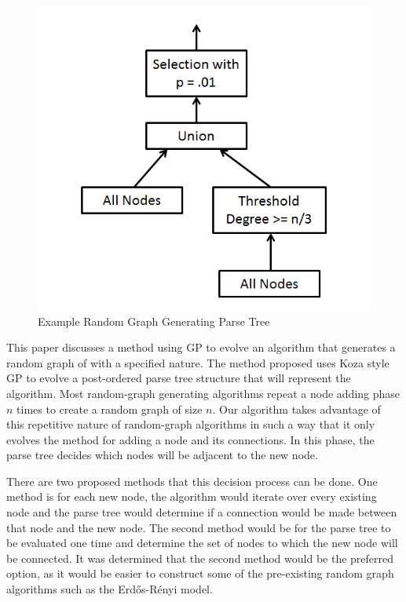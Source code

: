 \documentclass{article}
\begin{document}
\begin{figure}
\begin{centering}
  \includegraphics[scale=0.6]{RandomGraphExample}
  \caption{Example Random Graph Generating Parse Tree}
  \label{fig:example}
\end{centering}
\end{figure}


This paper discusses a method using GP to evolve an algorithm that generates a random graph of with a specified nature.  The method proposed uses Koza style GP to evolve a post-ordered parse tree structure that will represent the algorithm. Most random-graph generating algorithms repeat a node adding phase $n$ times to create a random graph of size $n$. Our algorithm takes advantage of this repetitive nature of random-graph algorithms in such a way that it only evolves the method for adding a node and its connections. In this phase, the parse tree decides which nodes will be adjacent to the new node.

There are two proposed methods that this decision process can be done. One method is for each new node, the algorithm would iterate over every existing node and the parse tree would determine if a connection would be made between that node and the new node. The second method would be for the parse tree to be evaluated one time and determine the set of nodes to which the new node will be connected.  It was determined that the second method would be the preferred option, as it would be easier to construct some of the pre-existing random graph algorithms such as the Erd\H{o}s-R\'{e}nyi model.
\end{document}
